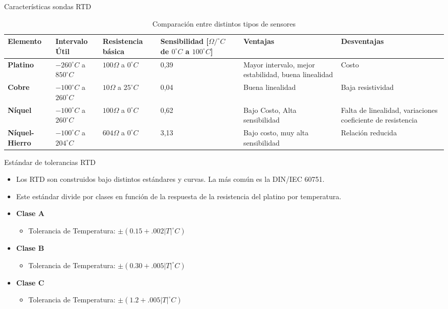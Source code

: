 \documentclass[aspectratio=169]{beamer}
\begin{document}
\begin{frame}{Características sondas RTD}
  \begin{table}[]
    \centering
    \scriptsize{
    \begin{tabular}{m{1.1cm} m{2.2cm} m{1.5cm} m{1.8cm} m{2.6cm} m{2.6cm}}
    \toprule
        \textbf{Elemento} & \textbf{Intervalo Útil} &\textbf{Resistencia básica} & \textbf{Sensibilidad [$\Omega/^{\circ} C$ de $0^{\circ} C$ a $100^{\circ} C$]} & \textbf{Ventajas} & \textbf{Desventajas}\\
    \midrule
       \textbf{Platino} & $-260 ^{\circ} C$ a $ 850^{\circ} C$ & $100\Omega$ a $0 ^{\circ} C$   & 0,39 & Mayor intervalo, mejor estabilidad, buena linealidad & Costo\\
       \textbf{Cobre} & $-100 ^{\circ} C$ a $ 260^{\circ} C$ & $10\Omega$ a $25 ^{\circ} C$   & 0,04 & Buena linealidad & Baja resistividad\\
       \textbf{Níquel} &  $-100 ^{\circ} C$ a $ 260^{\circ} C$ & $100\Omega$ a $0 ^{\circ} C$   & 0,62 & Bajo Costo, Alta sensibilidad & Falta de linealidad, variaciones coeficiente de resistencia\\
       \textbf{Níquel-Hierro} & $-100 ^{\circ} C$ a $ 204^{\circ} C$ & $604\Omega$ a $0 ^{\circ} C$   & 3,13 & Bajo costo, muy alta sensibilidad & Relación reducida\\
    \bottomrule
    \end{tabular}
    }
    \caption{Comparación entre distintos tipos de sensores\cite{sole2005instrumentacion}}
    \label{tab:Caracteristicas _rtd}
\end{table}
\end{frame}

\begin{frame}{Estándar de tolerancias RTD}
 \begin{itemize}
     \item Los RTD son construidos bajo distintos estándares y curvas. La más común es la DIN/IEC 60751.
     \item Este estándar divide por clases en función de la respuesta de la resistencia del platino por temperatura. 
     \item \textbf{Clase A}
     \begin{itemize}
         \item Tolerancia de Temperatura: $\pm (0.15 + .002|T| ^\circ C)$
     \end{itemize}
      \item \textbf{Clase B}
     \begin{itemize}
         \item Tolerancia de Temperatura: $\pm (0.30 + .005|T| ^\circ C)$
         \end{itemize}
    \item \textbf{Clase C}
     \begin{itemize}
         \item Tolerancia de Temperatura: $\pm (1.2 + .005|T| ^\circ C)$
     \end{itemize}
 \end{itemize}
\end{frame}
\end{document}
